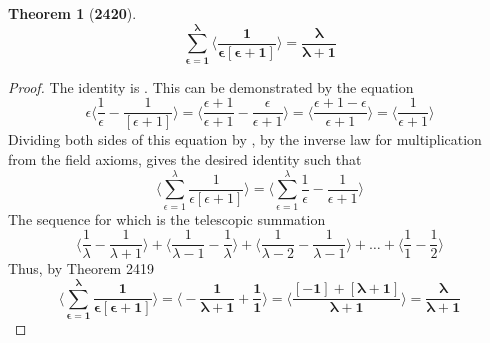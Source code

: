 \documentclass[preview]{standalone}
\newtheorem{theorem}{Theorem}
\begin{document}
\begin{theorem}[\textbf{2420}]
    \begin{equation*}
        \bm{
            \sum_{\epsilon=1}^\lambda 
                    \bigg \langle 
                        \frac{1}{\epsilon [ \epsilon + 1 ]}
                    \bigg \rangle
                = 
            \frac{\lambda}{\lambda + 1}
        }
    \end{equation*}
\end{theorem}

\begin{proof}
    The identity  is 
    . 
    This can be demonstrated by the equation
    \begin{equation*}
        \epsilon \bigg \langle \frac{1}{\epsilon} - \frac{1}{ [ \epsilon + 1 ] } \bigg \rangle 
            = 
        \bigg \langle \frac{\epsilon + 1}{\epsilon + 1} - \frac{\epsilon}{\epsilon + 1} \bigg \rangle
            = 
        \bigg \langle \frac{\epsilon + 1 - \epsilon}{\epsilon + 1} \bigg \rangle
            = 
        \bigg \langle \frac{1}{\epsilon + 1} \bigg \rangle
    \end{equation*}
    Dividing both sides of this equation by \bm{$\epsilon$},
    by the inverse law for multiplication from the field axioms,
    gives the desired identity such that
    \begin{equation*}
        \bigg \langle 
        \sum_{\epsilon=1}^\lambda 
                    \frac{1}{\epsilon [ \epsilon + 1 ]}
                \bigg \rangle 
            = 
        \bigg \langle 
        \sum_{\epsilon=1}^\lambda 
                    \frac{1}{\epsilon} - \frac{1}{\epsilon + 1} 
                \bigg \rangle
    \end{equation*}
    The sequence for which is the telescopic summation
    \begin{equation*}
        \bigg \langle \frac{1}{\lambda} - \frac{1}{\lambda + 1} \bigg \rangle
            + 
        \bigg \langle \frac{1}{\lambda - 1} - \frac{1}{\lambda} \bigg \rangle 
            + 
        \bigg \langle \frac{1}{\lambda - 2} - \frac{1}{\lambda - 1} \bigg \rangle
            + 
        \dots 
            + 
        \bigg \langle \frac{1}{1} - \frac{1}{2} \bigg \rangle
    \end{equation*}
    Thus, by Theorem 2419
    \begin{equation*}
        \bm{
            \bigg \langle
            \sum_{\epsilon=1}^\lambda
                        \frac{1}{ \epsilon [ \epsilon + 1 ] } 
                    \bigg \rangle
                = 
            \bigg \langle -\frac{1}{\lambda + 1} + \frac{1}{1} \bigg \rangle 
                = 
            \bigg \langle \frac{ [ -1 ] + [ \lambda + 1 ] }{\lambda + 1} \bigg \rangle 
                = 
            \frac{\lambda}{\lambda+1}
        }
    \end{equation*}
\end{proof}
\end{document}
